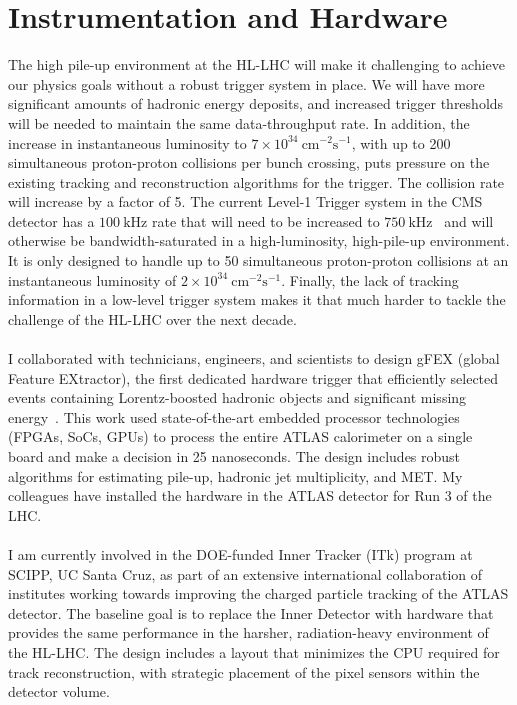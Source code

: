 \documentclass[10pt,a4paper,sans]{moderncv} %
\begin{document}
\section{Instrumentation and Hardware}
The high pile-up environment at the HL-LHC will make it challenging to achieve our physics goals without a robust trigger system in place. We will have more significant amounts of hadronic energy deposits, and increased trigger thresholds will be needed to maintain the same data-throughput rate. In addition, the increase in instantaneous luminosity to $7 \times 10^{34}\ \mathrm{cm}^{-2}\mathrm{s}^{-1}$, with up to 200 simultaneous proton-proton collisions per bunch crossing, puts pressure on the existing tracking and reconstruction algorithms for the trigger. The collision rate will increase by a factor of 5. The current Level-1 Trigger system in the CMS detector has a $100~\mathrm{kHz}$ rate that will need to be increased to $750~\mathrm{kHz}$~\cite{cmstrigger} and will otherwise be bandwidth-saturated in a high-luminosity, high-pile-up environment. It is only designed to handle up to 50 simultaneous proton-proton collisions at an instantaneous luminosity of $2 \times 10^{34}\ \mathrm{cm}^{-2}\mathrm{s}^{-1}$. Finally, the lack of tracking information in a low-level trigger system makes it that much harder to tackle the challenge of the HL-LHC over the next decade.
\\
\\
I collaborated with technicians, engineers, and scientists to design gFEX (global Feature EXtractor), the first dedicated hardware trigger that efficiently selected events containing Lorentz-boosted hadronic objects and significant missing energy~\cite{Begel:2233958, Tang:2104248}. This work used state-of-the-art embedded processor technologies (FPGAs, SoCs, GPUs) to process the entire ATLAS calorimeter on a single board and make a decision in 25 nanoseconds. The design includes robust algorithms for estimating pile-up, hadronic jet multiplicity, and MET. My colleagues have installed the hardware in the ATLAS detector for Run 3 of the LHC.
\\
\\
I am currently involved in the DOE-funded Inner Tracker (ITk) program at SCIPP, UC Santa Cruz, as part of an extensive international collaboration of institutes working towards improving the charged particle tracking of the ATLAS detector. The baseline goal is to replace the Inner Detector with hardware that provides the same performance in the harsher, radiation-heavy environment of the HL-LHC. The design includes a layout that minimizes the CPU required for track reconstruction, with strategic placement of the pixel sensors within the detector volume.
\end{document}

